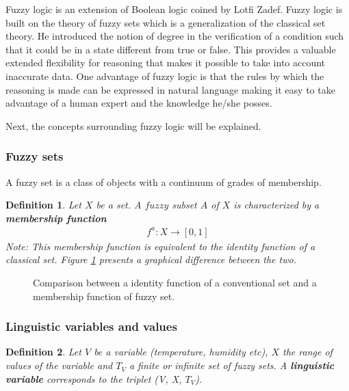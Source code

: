 \documentclass[conference]{IEEEtran}
\newtheorem{definition} {Definition}[section]
\let\Oldsubsubsection\subsubsection
\renewcommand{\subsubsection}{\FloatBarrier\Oldsubsubsection}
\begin{document}
Fuzzy logic is an extension of Boolean logic coined by Lotfi Zadef. Fuzzy logic is built on the theory of
fuzzy sets which is a generalization of the classical set theory. He introduced the notion of degree in the
verification of a condition such that it could be in a state different from true or false. This provides a
valuable extended flexibility for reasoning that makes it possible to take into account inaccurate data.
One advantage of fuzzy logic is that the rules by which the reasoning is made can be expressed in natural
language making it easy to take advantage of a human expert and the knowledge he/she posses.

Next, the concepts surrounding fuzzy logic will be explained.
\subsubsection{Fuzzy sets}

A fuzzy set is a class of objects with a continuum of grades of membership\cite{FuzzySets}.

\begin{definition}
\label{def:fuzzye_set}
Let $X$ be a set. A $fuzzy$ subset $A$ of $X$ is characterized by a \textbf{membership function}
\begin{align}
f^{a}: X \rightarrow [0, 1]
\end{align}
Note: This membership function is equivalent to the identity function of a classical set. Figure
\ref{fig:mf_comparison} presents a graphical difference between the two.
\end{definition}

\begin{figure}[h!]
\label{fig:mf_comparison}
\centerline{}
\centerline{}
      \caption[MainModule]{Comparison between a identity function of a conventional set and a membership
                           function of fuzzy set.}
\label{fig:mf_comparison}
\end{figure}

\subsubsection{Linguistic variables and values}
\begin{definition}
\label{def:ling_var}
Let $V$ be a variable (temperature, humidity etc), $X$ the range of values of the variable and $T_{V}$ a
finite or infinite set of fuzzy sets. A \textbf{linguistic variable} corresponds to the triplet (V, X, $T_{V}$).
\end{definition}
\end{document}
